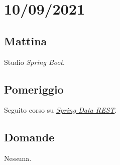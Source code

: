 \section{10/09/2021}
\subsection{Mattina}
Studio \textit{Spring Boot}.
\subsection{Pomeriggio}
Seguito corso su \textit{\href{https://www.youtube.com/watch?v=M3aAcOgeyuQ&ab_channel=JavaGuides}{Spring Data REST}}.
\subsection{Domande}
Nessuna.

